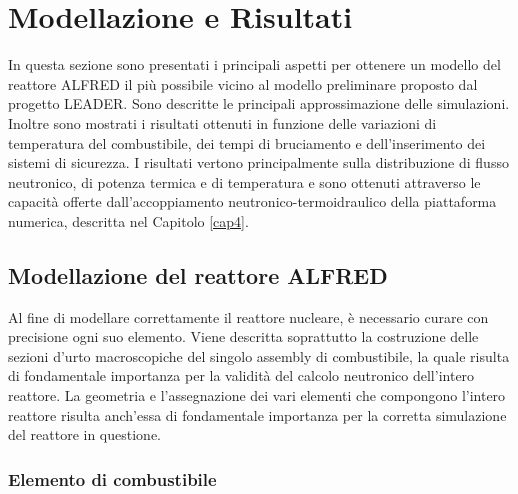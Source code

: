 \chapter{Modellazione e Risultati \label{cap5}}
In questa sezione sono presentati i principali aspetti per
ottenere un modello del reattore ALFRED il più possibile vicino al modello
preliminare proposto dal progetto LEADER. Sono descritte le principali
approssimazione delle simulazioni.
Inoltre sono mostrati i risultati ottenuti in funzione delle variazioni di 
temperatura
del combustibile, dei tempi di bruciamento e dell'inserimento dei sistemi di 
sicurezza.
I risultati vertono principalmente sulla distribuzione di flusso neutronico, di 
potenza termica
e di temperatura e sono ottenuti attraverso le capacità offerte dall'accoppiamento neutronico-termoidraulico della piattaforma numerica, descritta nel Capitolo \ref{cap4}.

\section{Modellazione del reattore ALFRED \label{modelalfred}}

Al fine di modellare correttamente il reattore nucleare, è necessario
curare con precisione ogni suo elemento.
Viene descritta soprattutto la costruzione delle sezioni d'urto macroscopiche del singolo assembly di combustibile, la quale risulta di 
fondamentale importanza
per la validità del calcolo neutronico dell'intero reattore.
La geometria e l'assegnazione dei vari elementi che compongono l'intero 
reattore 
risulta anch'essa di fondamentale importanza per la corretta simulazione
del reattore in questione.

\subsection{Elemento di combustibile}

